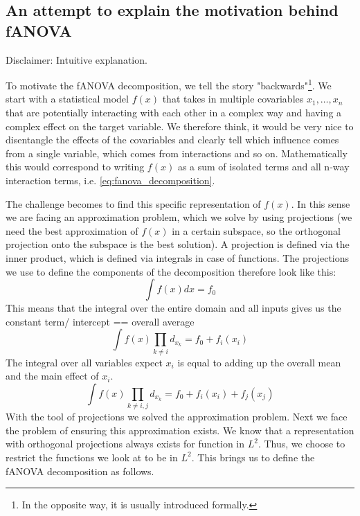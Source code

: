 \subsection*{An attempt to explain the motivation behind fANOVA}
Disclaimer: Intuitive explanation.\par
To motivate the fANOVA decomposition, we tell the story "backwards"\footnote{In the opposite way, it is usually introduced formally.}.
We start with a statistical model $f(x)$ that takes in multiple covariables $x_1,\dots, x_n$ that are potentially interacting with each other in a complex way and having a complex effect on the target variable. We therefore think, it would be very nice to disentangle the effects of the covariables and clearly tell which influence comes from a single variable, which comes from interactions and so on.
Mathematically this would correspond to writing $f(x)$ as a sum of isolated terms and all n-way interaction terms, i.e. \autoref{eq:fanova_decomposition}.\par
The challenge becomes to find this specific representation of $f(x)$. In this sense we are facing an approximation problem, which we solve by using projections (we need the best approximation of $f(x)$ in a certain subspace, so the orthogonal projection onto the subspace is the best solution). A projection is defined via the inner product, which is defined via integrals in case of functions. The projections we use to define the components of the decomposition therefore look like this:
\begin{equation}
    \int f(x) dx = f_0
\end{equation}
This means that the integral over the entire domain and all inputs gives us the constant term/ intercept == overall average
\begin{equation}
    \int f(x) \prod_{k \neq i} d_{x_{k}} = f_0 + f_i(x_i)
\end{equation}
The integral over all variables expect $x_i$ is equal to adding up the overall mean and the main effect of $x_i$.
\begin{equation}
    \int f(x) \prod_{k \neq i,j} d_{x_{k}} = f_0 + f_i(x_i) + f_j(x_j)
\end{equation}
With the tool of projections we solved the approximation problem. Next we face the problem of ensuring this approximation exists. We know that a representation with orthogonal projections always exists for function in $L^2$. Thus, we choose to restrict the functions we look at to be in $L^2$. This brings us to define the fANOVA decomposition as follows.\par

